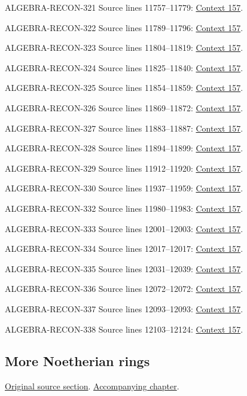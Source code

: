 \begin{AlgebraSourceRoutes}
\item[ALGEBRA-RECON-321] Source lines 11757--11779: \hyperlink{algebra-context-157}{Context 157}.
\item[ALGEBRA-RECON-322] Source lines 11789--11796: \hyperlink{algebra-context-157}{Context 157}.
\item[ALGEBRA-RECON-323] Source lines 11804--11819: \hyperlink{algebra-context-157}{Context 157}.
\item[ALGEBRA-RECON-324] Source lines 11825--11840: \hyperlink{algebra-context-157}{Context 157}.
\item[ALGEBRA-RECON-325] Source lines 11854--11859: \hyperlink{algebra-context-157}{Context 157}.
\item[ALGEBRA-RECON-326] Source lines 11869--11872: \hyperlink{algebra-context-157}{Context 157}.
\item[ALGEBRA-RECON-327] Source lines 11883--11887: \hyperlink{algebra-context-157}{Context 157}.
\item[ALGEBRA-RECON-328] Source lines 11894--11899: \hyperlink{algebra-context-157}{Context 157}.
\item[ALGEBRA-RECON-329] Source lines 11912--11920: \hyperlink{algebra-context-157}{Context 157}.
\item[ALGEBRA-RECON-330] Source lines 11937--11959: \hyperlink{algebra-context-157}{Context 157}.
\item[ALGEBRA-RECON-332] Source lines 11980--11983: \hyperlink{algebra-context-157}{Context 157}.
\item[ALGEBRA-RECON-333] Source lines 12001--12003: \hyperlink{algebra-context-157}{Context 157}.
\item[ALGEBRA-RECON-334] Source lines 12017--12017: \hyperlink{algebra-context-157}{Context 157}.
\item[ALGEBRA-RECON-335] Source lines 12031--12039: \hyperlink{algebra-context-157}{Context 157}.
\item[ALGEBRA-RECON-336] Source lines 12072--12072: \hyperlink{algebra-context-157}{Context 157}.
\item[ALGEBRA-RECON-337] Source lines 12093--12093: \hyperlink{algebra-context-157}{Context 157}.
\item[ALGEBRA-RECON-338] Source lines 12103--12124: \hyperlink{algebra-context-157}{Context 157}.
\end{AlgebraSourceRoutes}

\subsection{More Noetherian rings}
\hypertarget{algebra-source-section-Noetherian-again}{}
\noindent\href{https://github.com/stacks/stacks-project/blob/a04446e57ec1fbc252a871afcec7752fb2807b14/algebra.tex\#L12149}{Original source section}. \href{algebra.pdf\#nameddest=section-Noetherian-again}{Accompanying chapter}.

